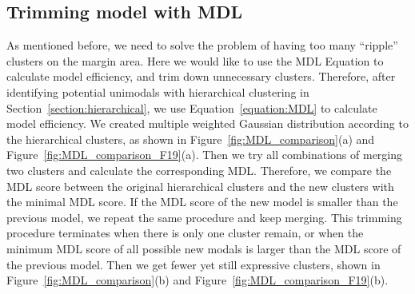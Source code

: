 \subsection{Trimming model with MDL}
As mentioned before, we need to solve the problem of having too many ``ripple'' clusters on the margin area.
Here we would like to use the MDL Equation to calculate model efficiency, and trim down unnecessary clusters.
Therefore, after identifying potential unimodals with hierarchical clustering in Section~\ref{section:hierarchical},
we use Equation~\ref{equation:MDL} to calculate model efficiency.
We created multiple weighted Gaussian distribution according to the hierarchical clusters, 
as shown in Figure~\ref{fig:MDL_comparison}(a) and Figure~\ref{fig:MDL_comparison_F19}(a).
Then we try all combinations of merging two clusters and calculate the corresponding MDL.
Therefore, we compare the MDL score between the original hierarchical clusters and the new clusters with the minimal MDL score.
If the MDL score of the new model is smaller than the previous model, we repeat the same procedure and keep merging.
This trimming procedure terminates when there is only one cluster remain, or when the minimum MDL score of all possible new modals is larger than the MDL score of the previous model.
Then we get fewer yet still expressive clusters, 
shown in Figure~\ref{fig:MDL_comparison}(b) and Figure~\ref{fig:MDL_comparison_F19}(b).















